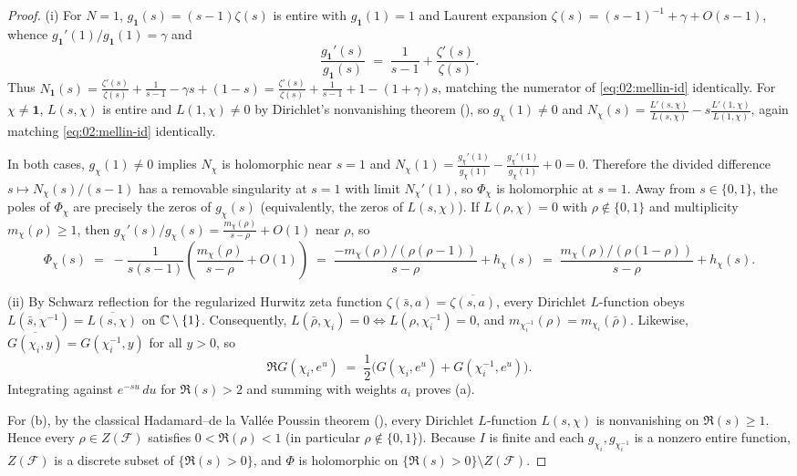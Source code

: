 \begin{proof}
(i) For $N = 1$, $g_{\mathbf{1}}(s) = (s-1)\zeta(s)$ is entire with $g_{\mathbf{1}}(1) = 1$ and Laurent expansion $\zeta(s) = (s-1)^{-1} + \gamma + O(s-1)$, whence $g_{\mathbf{1}}'(1)/g_{\mathbf{1}}(1) = \gamma$ and
\[
  \frac{g_{\mathbf{1}}'(s)}{g_{\mathbf{1}}(s)} \;=\; \frac{1}{s-1} + \frac{\zeta'(s)}{\zeta(s)}.
\]
Thus $N_{\mathbf{1}}(s) = \frac{\zeta'(s)}{\zeta(s)} + \frac{1}{s-1} - \gamma s + (1-s) = \frac{\zeta'(s)}{\zeta(s)} + \frac{1}{s-1} + 1 - (1+\gamma)s$, matching the numerator of \eqref{eq:02:mellin-id} identically. For $\chi \neq \mathbf{1}$, $L(s, \chi)$ is entire and $L(1, \chi) \neq 0$ by Dirichlet's nonvanishing theorem (), so $g_\chi(1) \neq 0$ and $N_\chi(s) = \frac{L'(s,\chi)}{L(s,\chi)} - s\frac{L'(1,\chi)}{L(1,\chi)}$, again matching \eqref{eq:02:mellin-id} identically.

In both cases, $g_\chi(1) \neq 0$ implies $N_\chi$ is holomorphic near $s = 1$ and $N_\chi(1) = \frac{g_\chi'(1)}{g_\chi(1)} - \frac{g_\chi'(1)}{g_\chi(1)} + 0 = 0$. Therefore the divided difference $s \mapsto N_\chi(s)/(s-1)$ has a removable singularity at $s = 1$ with limit $N_\chi'(1)$, so $\Phi_\chi$ is holomorphic at $s = 1$. Away from $s \in \{0, 1\}$, the poles of $\Phi_\chi$ are precisely the zeros of $g_\chi(s)$ (equivalently, the zeros of $L(s, \chi)$). If $L(\rho, \chi) = 0$ with $\rho \notin \{0, 1\}$ and multiplicity $m_\chi(\rho) \ge 1$, then $g_\chi'(s)/g_\chi(s) = \frac{m_\chi(\rho)}{s-\rho} + O(1)$ near $\rho$, so
\[
  \Phi_\chi(s) \;=\; -\frac{1}{s(s-1)}\left(\frac{m_\chi(\rho)}{s-\rho} + O(1)\right)
  \;=\; \frac{-m_\chi(\rho)/(\rho(\rho-1))}{s-\rho} + h_\chi(s)
  \;=\; \frac{m_\chi(\rho)/(\rho(1-\rho))}{s-\rho} + h_\chi(s).
\]

(ii) By Schwarz reflection for the regularized Hurwitz zeta function $\zeta(\bar{s}, a) = \overline{\zeta(s, a)}$, every Dirichlet $L$-function obeys $L(\bar{s}, \chi^{-1}) = \overline{L(s, \chi)}$ on $\mathbb{C} \setminus \{1\}$. Consequently, $L(\bar{\rho}, \chi_i) = 0 \iff L(\rho, \chi_i^{-1}) = 0$, and $m_{\chi_i^{-1}}(\rho) = m_{\chi_i}(\bar{\rho})$. Likewise, $\overline{G(\chi_i, y)} = G(\chi_i^{-1}, y)$ for all $y > 0$, so
\[
  \Re G(\chi_i, e^u) \;=\; \frac{1}{2}\bigl(G(\chi_i, e^u) + G(\chi_i^{-1}, e^u)\bigr).
\]
Integrating against $e^{-su}\,du$ for $\Re(s) > 2$ and summing with weights $a_i$ proves (a).

For (b), by the classical Hadamard--de la Vall\'ee Poussin theorem (), every Dirichlet $L$-function $L(s, \chi)$ is nonvanishing on $\Re(s) \ge 1$. Hence every $\rho \in Z(\mathcal{F})$ satisfies $0 < \Re(\rho) < 1$ (in particular $\rho \notin \{0, 1\}$). Because $I$ is finite and each $g_{\chi_i}, g_{\chi_i^{-1}}$ is a nonzero entire function, $Z(\mathcal{F})$ is a discrete subset of $\{\Re(s) > 0\}$, and $\Phi$ is holomorphic on $\{\Re(s) > 0\} \setminus Z(\mathcal{F})$.


\end{proof}

